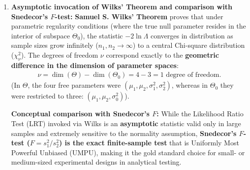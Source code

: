 \begin{solucion}
\begin{enumerate}
		\item \textbf{Asymptotic invocation of Wilks' Theorem and comparison with Snedecor's $F$-test:}
		\textbf{Samuel S. Wilks' Theorem} proves that under parametric regularity conditions (where the true null parameter resides in the interior of subspace $\Theta_0$), the statistic $-2\ln\Lambda$ converges in distribution as sample sizes grow infinitely ($n_1, n_2 \to \infty$) to a central Chi-square distribution ($\chi^2_\nu$).
		The degrees of freedom $\nu$ correspond exactly to the \textbf{geometric difference in the dimension of parameter spaces}:
		\begin{align}
			\nu = \dim(\Theta) - \dim(\Theta_0) = 4 - 3 = 1 \text{ degree of freedom.}
		\end{align}
		(In $\Theta$, the four free parameters were $(\mu_1, \mu_2, \sigma_1^2, \sigma_2^2)$, whereas in $\Theta_0$ they were restricted to three: $(\mu_1, \mu_2, \sigma_0^2)$).
		
		\textbf{Conceptual comparison with Snedecor's $F$:} While the Likelihood Ratio Test (LRT) invoked via Wilks is an \textbf{asymptotic} statistic valid only in large samples and extremely sensitive to the normality assumption, \textbf{Snedecor's $F$-test ($F = s_1^2 / s_2^2$) is the exact finite-sample test} that is Uniformly Most Powerful Unbiased (UMPU), making it the gold standard choice for small- or medium-sized experimental designs in analytical testing.
	\end{enumerate}
\end{solucion}

